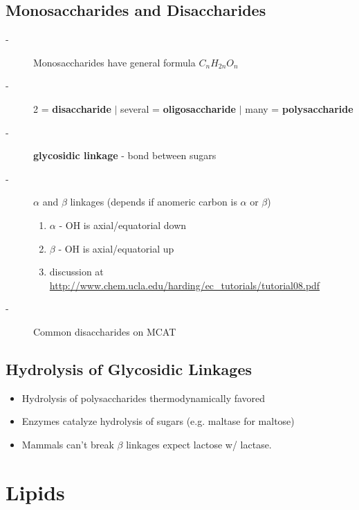 \documentclass[10pt,a4paper]{report}
\begin{document}
	\subsection{Monosaccharides and Disaccharides}
	\begin{description}
		\item[-] Monosaccharides have general formula $C_{n}H_{2n}O_{n}$
		\item[-] 2 = \textbf{disaccharide} $|$ several = \textbf{oligosaccharide} $|$ many = \textbf{polysaccharide}
		\item[-] \textbf{glycosidic linkage} - bond between sugars
		\item[-] $\alpha$ and $\beta$ linkages (depends if anomeric carbon is $\alpha$ or $\beta$)
		\begin{enumerate}
			\item $\alpha$ - OH is axial/equatorial down
			\item $\beta$ - OH is axial/equatorial up
			\item discussion at \url{http://www.chem.ucla.edu/harding/ec_tutorials/tutorial08.pdf}
		\end{enumerate}
		\item[-] Common disaccharides on MCAT \\
	\end{description}
	
	\subsection{Hydrolysis of Glycosidic Linkages}
	
	\begin{itemize}
		\item Hydrolysis of polysaccharides thermodynamically favored
		\item Enzymes catalyze hydrolysis of sugars (e.g. maltase for maltose)
		\item Mammals can't break $\beta$ linkages expect lactose w/ lactase.
	\end{itemize}
	
	\section{Lipids}
	
\end{document}

